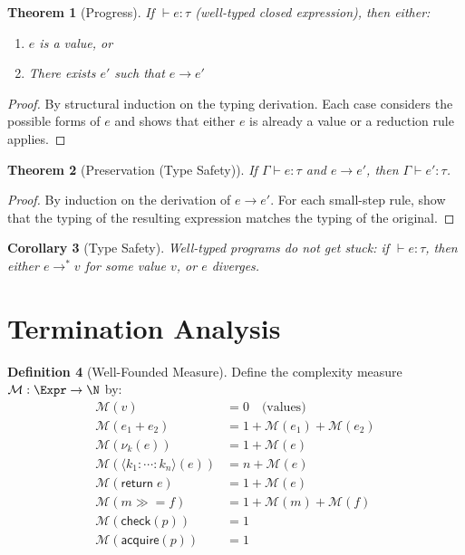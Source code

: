 \documentclass[11pt,twoside,openright]{book}
\theoremstyle{definition}
\newtheorem{definition}{Definition}[chapter]
\theoremstyle{plain}
\newtheorem{theorem}[definition]{Theorem}
\newtheorem{corollary}[definition]{Corollary}
\theoremstyle{remark}
\newcommand{\noe}[1]{\nu_{#1}}
\newcommand{\rpmret}{\mathsf{return}}
\newcommand{\rpmbind}{\mathbin{\gg\!=}}
\newcommand{\smallstep}{\to}
\begin{document}
\begin{theorem}[Progress]
\label{thm:progress}
If $\vdash e : \tau$ (well-typed closed expression), then either:
\begin{enumerate}
\item $e$ is a value, or
\item There exists $e'$ such that $e \smallstep e'$
\end{enumerate}
\end{theorem}

\begin{proof}
By structural induction on the typing derivation. Each case considers the possible forms of $e$ and shows that either $e$ is already a value or a reduction rule applies.
\end{proof}

\begin{theorem}[Preservation (Type Safety)]
\label{thm:preservation}
If $\Gamma \vdash e : \tau$ and $e \smallstep e'$, then $\Gamma \vdash e' : \tau$.
\end{theorem}

\begin{proof}
By induction on the derivation of $e \smallstep e'$. For each small-step rule, show that the typing of the resulting expression matches the typing of the original.
\end{proof}

\begin{corollary}[Type Safety]
\label{cor:type-safety}
Well-typed programs do not get stuck: if $\vdash e : \tau$, then either $e \smallstep^* v$ for some value $v$, or $e$ diverges.
\end{corollary}

\section{Termination Analysis}

\begin{definition}[Well-Founded Measure]
\label{def:termination-measure}
Define the complexity measure $\mathcal{M} : \Expr \to \N$ by:
\begin{align}
\mathcal{M}(v) &= 0 \quad \text{(values)} \\
\mathcal{M}(e_1 + e_2) &= 1 + \mathcal{M}(e_1) + \mathcal{M}(e_2) \\
\mathcal{M}(\noe{k}(e)) &= 1 + \mathcal{M}(e) \\
\mathcal{M}(\langle k_1 : \cdots : k_n \rangle(e)) &= n + \mathcal{M}(e) \\
\mathcal{M}(\rpmret\; e) &= 1 + \mathcal{M}(e) \\
\mathcal{M}(m \rpmbind f) &= 1 + \mathcal{M}(m) + \mathcal{M}(f) \\
\mathcal{M}(\mathsf{check}(p)) &= 1 \\
\mathcal{M}(\mathsf{acquire}(p)) &= 1
\end{align}
\end{definition}
\end{document}
